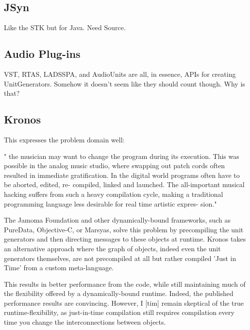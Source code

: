 \documentclass[twoside,10pt]{article}
\begin{document}



\subsection{JSyn} %

Like the STK but for Java.  Need Source.


\subsection{Audio Plug-ins} %

VST, RTAS, LADSSPA, and AudioUnits are all, in essence, APIs for creating UnitGenerators.  Somehow it doesn't seem like they should count though.  Why is that?


\subsection{Kronos} %

This expresses the problem domain well:

" the musician may want to change the program during its execution. This was possible in the analog music studio, where swapping out patch cords often resulted in immediate gratification. In the digital world programs often have to be aborted, edited, re- compiled, linked and launched. The all-important musical hacking suffers from such a heavy compilation cycle, making a traditional programming language less desirable for real time artistic expres- sion." \cite{Norilo:2009}

The Jamoma Foundation and other dynamically-bound frameworks, such as PureData, Objective-C, or Marsyas, solve this problem by precompiling the unit generators and then directing messages to these objects at runtime.  Kronos takes an alternative approach where the graph of objects, indeed even the unit generators themselves, are not precompiled at all but rather compiled 'Just in Time' from a custom meta-language. 

This results in better performance from the code, while still maintaining much of the flexibility offered by a dynamically-bound runtime.  Indeed, the published performance results are convincing.  However, I [tim] remain skeptical of the true runtime-flexibility, as just-in-time compilation still requires compilation every time you change the interconnections between objects.
\end{document}
